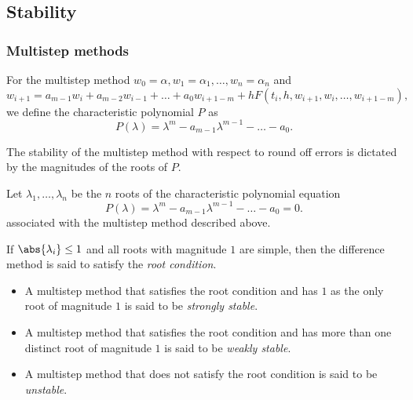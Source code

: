 \documentclass[12pt]{article}
\begin{document}
\subsection{Stability} \label{sec:stability}
\subsubsection{Multistep methods} \label{sec:multistep}
\begin{definition} \label{def:multistep:character}
    For the multistep method
    $w_0 = \alpha, w_1 = \alpha_1, \dots, w_n = \alpha_n$ and \[
        w_{i+1} = a_{m-1} w_i + a_{m-2} w_{i-1} + \dots + a_0 w_{i+1-m}
            + h F(t_i, h, w_{i+1}, w_i, \dots, w_{i+1-m}),
    \] we define the characteristic polynomial $P$ as \[
        P(\lambda) = \lambda^m - a_{m-1} \lambda^{m-1} - \dots - a_0.
    \]
\end{definition}
The stability of the multistep method with respect to round off errors is
dictated by the magnitudes of the roots of $P$.
\begin{definition} \label{def:stability:root_condition}
    Let $\lambda_1, \dots, \lambda_n$ be the $n$ roots of the characteristic
    polynomial equation \[
        P(\lambda) = \lambda^m - a_{m-1} \lambda^{m-1} - \dots - a_0 = 0.
    \] associated with the multistep method described above.

    If $\abs{\lambda_i} \leq 1$ and all roots with magnitude $1$ are simple,
    then the difference method is said to satisfy the \emph{root condition}.
\end{definition}
\hfill \begin{minipage}{0.9\textwidth}
    \begin{definition} \label{def:multistep:stable} \leavevmode
        \begin{itemize}
            \item A multistep method that satisfies the root condition and has
                $1$ as the only root of magnitude $1$ is said to be
                \emph{strongly stable}.
            \item A multistep method that satisfies the root condition and has
                more than one distinct root of magnitude $1$ is said to be
                \emph{weakly stable}.
            \item A multistep method that does not satisfy the root condition
                is said to be \emph{unstable}.
        \end{itemize}
    \end{definition}
\end{minipage}
\end{document}
